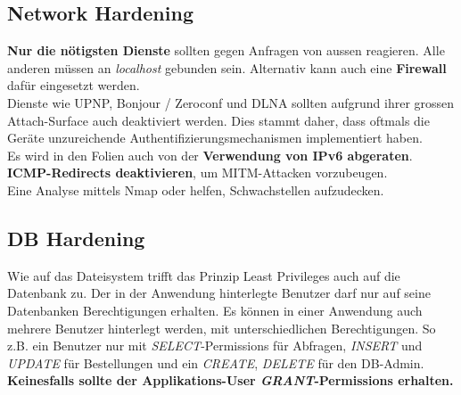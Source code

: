 \subsection{Network Hardening}
\textbf{Nur die nötigsten Dienste} sollten gegen Anfragen von aussen reagieren. Alle anderen müssen an \textit{localhost} gebunden sein. Alternativ kann auch eine \textbf{Firewall} dafür eingesetzt werden.\\
Dienste wie UPNP, Bonjour / Zeroconf und DLNA sollten aufgrund ihrer grossen Attach-Surface auch deaktiviert werden. Dies stammt daher, dass oftmals die Geräte unzureichende Authentifizierungsmechanismen implementiert haben.\\

Es wird in den Folien auch von der \textbf{Verwendung von IPv6 abgeraten}.\\

\textbf{ICMP-Redirects deaktivieren}, um MITM-Attacken vorzubeugen.\\

Eine Analyse mittels Nmap oder  helfen, Schwachstellen aufzudecken.

\subsection{DB Hardening}
Wie auf das Dateisystem trifft das Prinzip Least Privileges auch auf die Datenbank zu. Der in der Anwendung hinterlegte Benutzer darf nur auf seine Datenbanken Berechtigungen erhalten. Es können in einer Anwendung auch mehrere Benutzer hinterlegt werden, mit unterschiedlichen Berechtigungen. So z.B. ein Benutzer nur mit \textit{SELECT}-Permissions für Abfragen, \textit{INSERT} und \textit{UPDATE} für Bestellungen und ein \textit{CREATE}, \textit{DELETE} für den DB-Admin.\\
\textbf{Keinesfalls sollte der Applikations-User \textit{GRANT}-Permissions erhalten.}
